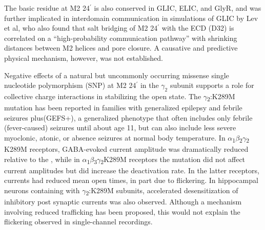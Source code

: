 \documentclass[9pt,twocolumn,twoside,lineno]{pnas-new}
\begin{document}
The basic residue at M2 24$^{\prime}$ is also conserved in GLIC, ELIC, and GlyR, and was further implicated in interdomain communication in simulations of GLIC by Lev et al\cite{Lev2017}, who also found that salt bridging of M2 24$^{\prime}$ with the ECD (D32) is correlated on a ``high-probability communication pathway'' with shrinking distances between M2 helices and pore closure. %
A causative and predictive physical mechanism, however, was not established. 

Negative effects of a natural but uncommonly occurring missense single nucleotide polymorphism (SNP) at M2 24$^{\prime}$ in the $\gamma_{2}$ subunit supports a role for collective charge interactions in stabilizing the open state.  
The \(\gamma\)\textsubscript{2}:K289M mutation has been reported in families with generalized epilepsy and febrile seizures plus(GEFS+)\cite{Mac2010,Baulac2001,Bianchi2002}, a generalized phenotype that often includes only febrile (fever-caused) seizures until about age 11, but can also include less severe myoclonic, atonic, or absence seizures at normal body temperature. In \(\alpha\)\textsubscript{1}\(\beta\)\textsubscript{2}\(\gamma\)\textsubscript{2} K289M receptors, GABA-evoked current amplitude was dramatically reduced relative to the \WT \cite{Baulac2001,Ramakrishnan2004}, while in \(\alpha\)\textsubscript{1}\(\beta\)\textsubscript{3}\(\gamma\)\textsubscript{2}K289M receptors the mutation did not affect current amplitudes but did increase the deactivation rate\cite{Eugene2007}. In the latter receptors, currents had reduced mean open times, in part due to flickering\cite{Bianchi2002,Macdonald2006,Hales2006}. In hippocampal neurons containing \GABAA with \(\gamma\)\textsubscript{2}:K289M subunits, %
accelerated desensitization of inhibitory post synaptic currents was also observed\cite{Eugene2007}.  Although a mechanism involving reduced trafficking has been proposed,\cite{Kang2006} this would not explain the flickering observed in single-channel recordings.\cite{Bianchi2002}  
\end{document}
